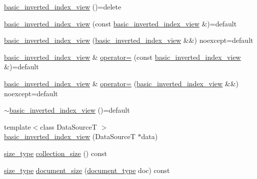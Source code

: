 \begin{DoxyCompactItemize}
\item 
\mbox{\hyperlink{classirk_1_1basic__inverted__index__view_a8f30f4f42aae72ec340cf198557b0a25}{basic\+\_\+inverted\+\_\+index\+\_\+view}} ()=delete
\item 
\mbox{\hyperlink{classirk_1_1basic__inverted__index__view_ab8a6c43523b96e95044bb68e6fdfd54a}{basic\+\_\+inverted\+\_\+index\+\_\+view}} (const \mbox{\hyperlink{classirk_1_1basic__inverted__index__view}{basic\+\_\+inverted\+\_\+index\+\_\+view}} \&)=default
\item 
\mbox{\hyperlink{classirk_1_1basic__inverted__index__view_a89b00d9e8a620fdc318f419d1a628b1c}{basic\+\_\+inverted\+\_\+index\+\_\+view}} (\mbox{\hyperlink{classirk_1_1basic__inverted__index__view}{basic\+\_\+inverted\+\_\+index\+\_\+view}} \&\&) noexcept=default
\item 
\mbox{\hyperlink{classirk_1_1basic__inverted__index__view}{basic\+\_\+inverted\+\_\+index\+\_\+view}} \& \mbox{\hyperlink{classirk_1_1basic__inverted__index__view_a61b08aa3e377ac442f95488ef8514ba5}{operator=}} (const \mbox{\hyperlink{classirk_1_1basic__inverted__index__view}{basic\+\_\+inverted\+\_\+index\+\_\+view}} \&)=default
\item 
\mbox{\hyperlink{classirk_1_1basic__inverted__index__view}{basic\+\_\+inverted\+\_\+index\+\_\+view}} \& \mbox{\hyperlink{classirk_1_1basic__inverted__index__view_a35a6bba483082c7060577551f1511763}{operator=}} (\mbox{\hyperlink{classirk_1_1basic__inverted__index__view}{basic\+\_\+inverted\+\_\+index\+\_\+view}} \&\&) noexcept=default
\item 
\mbox{\hyperlink{classirk_1_1basic__inverted__index__view_a737a736a6a54a55d22c493b9d78e81e3}{$\sim$basic\+\_\+inverted\+\_\+index\+\_\+view}} ()=default
\item 
{\footnotesize template$<$class Data\+SourceT $>$ }\\\mbox{\hyperlink{classirk_1_1basic__inverted__index__view_a84a35a3338c4c00bd80345a1ddfdd342}{basic\+\_\+inverted\+\_\+index\+\_\+view}} (Data\+SourceT $\ast$data)
\item 
\mbox{\hyperlink{classirk_1_1basic__inverted__index__view_a57ae4c0a2a602340c31996d3e240be46}{size\+\_\+type}} \mbox{\hyperlink{classirk_1_1basic__inverted__index__view_a15e7fc01a2e9a4e79eef6fa6ca103632}{collection\+\_\+size}} () const
\item 
\mbox{\hyperlink{classirk_1_1basic__inverted__index__view_a57ae4c0a2a602340c31996d3e240be46}{size\+\_\+type}} \mbox{\hyperlink{classirk_1_1basic__inverted__index__view_a8b804064946c0ee238599fb6c84215c7}{document\+\_\+size}} (\mbox{\hyperlink{classirk_1_1basic__inverted__index__view_aa687d7f6babce15088ca5792a6fbb9b3}{document\+\_\+type}} doc) const

\end{DoxyCompactItemize}
